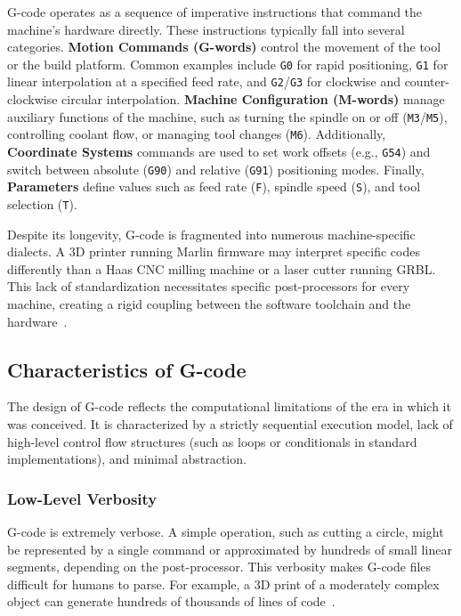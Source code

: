 G-code operates as a sequence of imperative instructions that command the machine's hardware directly. These instructions typically fall into several categories. \textbf{Motion Commands (G-words)} control the movement of the tool or the build platform. Common examples include \texttt{G0} for rapid positioning, \texttt{G1} for linear interpolation at a specified feed rate, and \texttt{G2}/\texttt{G3} for clockwise and counter-clockwise circular interpolation. \textbf{Machine Configuration (M-words)} manage auxiliary functions of the machine, such as turning the spindle on or off (\texttt{M3}/\texttt{M5}), controlling coolant flow, or managing tool changes (\texttt{M6}). Additionally, \textbf{Coordinate Systems} commands are used to set work offsets (e.g., \texttt{G54}) and switch between absolute (\texttt{G90}) and relative (\texttt{G91}) positioning modes. Finally, \textbf{Parameters} define values such as feed rate (\texttt{F}), spindle speed (\texttt{S}), and tool selection (\texttt{T}).

Despite its longevity, G-code is fragmented into numerous machine-specific dialects. A 3D printer running Marlin firmware may interpret specific codes differently than a Haas CNC milling machine or a laser cutter running GRBL. This lack of standardization necessitates specific post-processors for every machine, creating a rigid coupling between the software toolchain and the hardware~\cite{tiro_rapid_2025, noauthor_ultimate_nodate}.

\subsection{Characteristics of G-code}

The design of G-code reflects the computational limitations of the era in which it was conceived. It is characterized by a strictly sequential execution model, lack of high-level control flow structures (such as loops or conditionals in standard implementations), and minimal abstraction.

\subsubsection{Low-Level Verbosity}
G-code is extremely verbose. A simple operation, such as cutting a circle, might be represented by a single command or approximated by hundreds of small linear segments, depending on the post-processor. This verbosity makes G-code files difficult for humans to parse. For example, a 3D print of a moderately complex object can generate hundreds of thousands of lines of code~\cite{beyer_slicer-independent_2026}.

